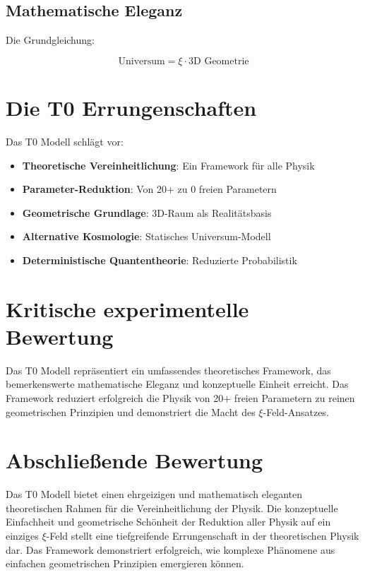 	\subsection{Mathematische Eleganz}
	
	Die Grundgleichung:
	
	\begin{equation}
		\boxed{\text{Universum} = \xi \cdot \text{3D Geometrie}}
	\end{equation}
	
	
	\section{Die T0 Errungenschaften}
	
	Das T0 Modell schlägt vor:
	
	\begin{itemize}
		\item \textbf{Theoretische Vereinheitlichung}: Ein Framework für alle Physik
		\item \textbf{Parameter-Reduktion}: Von 20+ zu 0 freien Parametern
		\item \textbf{Geometrische Grundlage}: 3D-Raum als Realitätsbasis
		\item \textbf{Alternative Kosmologie}: Statisches Universum-Modell
		\item \textbf{Deterministische Quantentheorie}: Reduzierte Probabilistik
	\end{itemize}
	
	\section{Kritische experimentelle Bewertung}
	
	Das T0 Modell repräsentiert ein umfassendes theoretisches Framework, das bemerkenswerte mathematische Eleganz und konzeptuelle Einheit erreicht. Das Framework reduziert erfolgreich die Physik von 20+ freien Parametern zu reinen geometrischen Prinzipien und demonstriert die Macht des $\xi$-Feld-Ansatzes.
	
	\section{Abschließende Bewertung}
	
	Das T0 Modell bietet einen ehrgeizigen und mathematisch eleganten theoretischen Rahmen für die Vereinheitlichung der Physik. Die konzeptuelle Einfachheit und geometrische Schönheit der Reduktion aller Physik auf ein einziges $\xi$-Feld stellt eine tiefgreifende Errungenschaft in der theoretischen Physik dar. Das Framework demonstriert erfolgreich, wie komplexe Phänomene aus einfachen geometrischen Prinzipien emergieren können.
	
